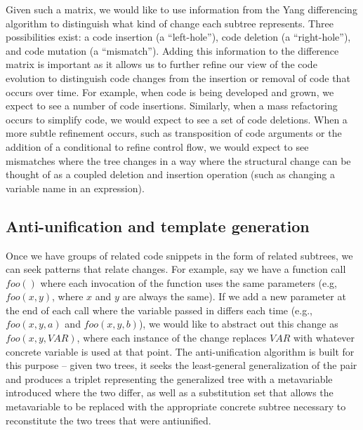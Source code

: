Given such a matrix, we would like to use information from the Yang
differencing algorithm to distinguish what kind of change each subtree
represents.  Three possibilities exist: a code insertion (a ``left-hole''),
code deletion (a ``right-hole''), and code mutation (a ``mismatch'').  Adding
this information to the difference matrix is important as it allows us to
further refine our view of the code evolution to distinguish code changes from
the insertion or removal of code that occurs over time. For example, when code
is being developed and grown, we expect to see a number of code insertions.
Similarly, when a mass refactoring occurs to simplify code, we would expect to
see a set of code deletions.  When a more subtle refinement occurs, such as
transposition of  code arguments or the addition of a conditional to refine
control flow, we would expect to see mismatches where the tree changes in a
way where the structural change can be thought of as a  coupled deletion and
insertion operation (such as changing a variable name in an expression).

\subsection{Anti-unification and template generation}

Once we have groups of related code snippets in the form of related
subtrees, we can seek patterns that relate changes.  For example, say we have
a function call $foo()$ where each invocation of the function uses the same
parameters (e.g, $foo(x,y)$, where $x$ and $y$ are always the same). If we add
a new parameter at the end of each call where the variable passed in differs
each time (e.g., $foo(x,y,a)$ and $foo(x,y,b)$), we would like to abstract out
this change as $foo(x,y,VAR)$, where each instance of the change replaces
$VAR$ with whatever concrete variable is used at that point.  The anti-unification
algorithm is built for this purpose -- given two trees, it seeks the least-general
generalization of the pair and produces a triplet representing the generalized tree with
a metavariable introduced where the two differ, as well as a substitution set that allows
the metavariable to be replaced with the appropriate concrete subtree necessary to
reconstitute the two trees that were antiunified.
